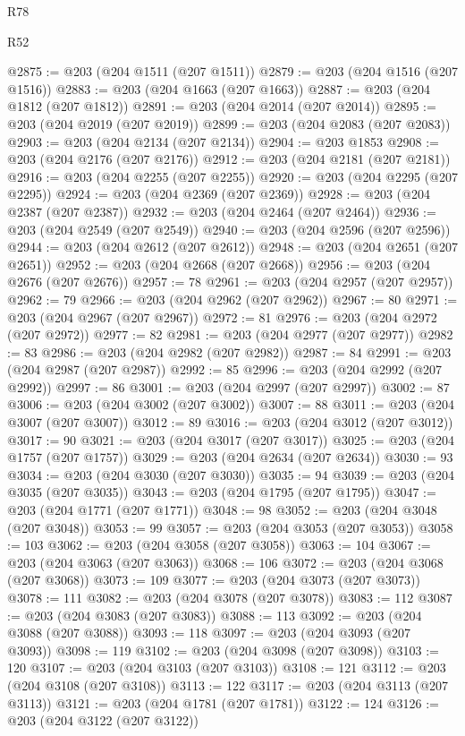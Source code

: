 \begin{lexlean}{R78}
\begin{lexlean}{R52}
\begin{coremodule}
{{{{{{{{{{{{{{{{{{{{{{{{{{{{{{{{{{{{{{{{{{{{{{{{{{{{{{{{{{{{{{{{{{{{{{{{{{{{{{{{{{{{{{{{{{{{{{{{{{{{{{{{{{{{{{{{{{{{{{{{{{{{{{{{{{{{{{{{{{{{{{{{{{{{{{{{{{{{{{{{{{{{{{{{{{{{{{{{{{{{{{{{{{{{{{{{{{{{{{@2875 := @203 (@204 @1511 (@207 @1511))
@2879 := @203 (@204 @1516 (@207 @1516))
@2883 := @203 (@204 @1663 (@207 @1663))
@2887 := @203 (@204 @1812 (@207 @1812))
@2891 := @203 (@204 @2014 (@207 @2014))
@2895 := @203 (@204 @2019 (@207 @2019))
@2899 := @203 (@204 @2083 (@207 @2083))
@2903 := @203 (@204 @2134 (@207 @2134))
@2904 := @203 @1853
@2908 := @203 (@204 @2176 (@207 @2176))
@2912 := @203 (@204 @2181 (@207 @2181))
@2916 := @203 (@204 @2255 (@207 @2255))
@2920 := @203 (@204 @2295 (@207 @2295))
@2924 := @203 (@204 @2369 (@207 @2369))
@2928 := @203 (@204 @2387 (@207 @2387))
@2932 := @203 (@204 @2464 (@207 @2464))
@2936 := @203 (@204 @2549 (@207 @2549))
@2940 := @203 (@204 @2596 (@207 @2596))
@2944 := @203 (@204 @2612 (@207 @2612))
@2948 := @203 (@204 @2651 (@207 @2651))
@2952 := @203 (@204 @2668 (@207 @2668))
@2956 := @203 (@204 @2676 (@207 @2676))
@2957 := 78
@2961 := @203 (@204 @2957 (@207 @2957))
@2962 := 79
@2966 := @203 (@204 @2962 (@207 @2962))
@2967 := 80
@2971 := @203 (@204 @2967 (@207 @2967))
@2972 := 81
@2976 := @203 (@204 @2972 (@207 @2972))
@2977 := 82
@2981 := @203 (@204 @2977 (@207 @2977))
@2982 := 83
@2986 := @203 (@204 @2982 (@207 @2982))
@2987 := 84
@2991 := @203 (@204 @2987 (@207 @2987))
@2992 := 85
@2996 := @203 (@204 @2992 (@207 @2992))
@2997 := 86
@3001 := @203 (@204 @2997 (@207 @2997))
@3002 := 87
@3006 := @203 (@204 @3002 (@207 @3002))
@3007 := 88
@3011 := @203 (@204 @3007 (@207 @3007))
@3012 := 89
@3016 := @203 (@204 @3012 (@207 @3012))
@3017 := 90
@3021 := @203 (@204 @3017 (@207 @3017))
@3025 := @203 (@204 @1757 (@207 @1757))
@3029 := @203 (@204 @2634 (@207 @2634))
@3030 := 93
@3034 := @203 (@204 @3030 (@207 @3030))
@3035 := 94
@3039 := @203 (@204 @3035 (@207 @3035))
@3043 := @203 (@204 @1795 (@207 @1795))
@3047 := @203 (@204 @1771 (@207 @1771))
@3048 := 98
@3052 := @203 (@204 @3048 (@207 @3048))
@3053 := 99
@3057 := @203 (@204 @3053 (@207 @3053))
@3058 := 103
@3062 := @203 (@204 @3058 (@207 @3058))
@3063 := 104
@3067 := @203 (@204 @3063 (@207 @3063))
@3068 := 106
@3072 := @203 (@204 @3068 (@207 @3068))
@3073 := 109
@3077 := @203 (@204 @3073 (@207 @3073))
@3078 := 111
@3082 := @203 (@204 @3078 (@207 @3078))
@3083 := 112
@3087 := @203 (@204 @3083 (@207 @3083))
@3088 := 113
@3092 := @203 (@204 @3088 (@207 @3088))
@3093 := 118
@3097 := @203 (@204 @3093 (@207 @3093))
@3098 := 119
@3102 := @203 (@204 @3098 (@207 @3098))
@3103 := 120
@3107 := @203 (@204 @3103 (@207 @3103))
@3108 := 121
@3112 := @203 (@204 @3108 (@207 @3108))
@3113 := 122
@3117 := @203 (@204 @3113 (@207 @3113))
@3121 := @203 (@204 @1781 (@207 @1781))
@3122 := 124
@3126 := @203 (@204 @3122 (@207 @3122))
}}}}}}}}}}}}}}}}}}}}}}}}}}}}}}}}}}}}}}}}}}}}}}}}}}}}}}}}}}}}}}}}}}}}}}}}}}}}}}}}}}}}}}}}}}}}}}}}}}}}}}}}}}}}}}}}}}}}}}}}}}}}}}}}}}}}}}}}}}}}}}}}}}}}}}}}}}}}}}}}}}}}}}}}}}}}}}}}}}}}}}}}}}}}}}}}}}}}}}
\end{coremodule}
\end{lexlean}
\end{lexlean}
